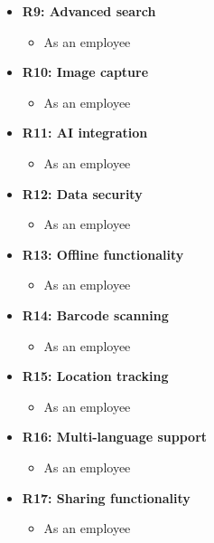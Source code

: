 \documentclass[hidelinks, 12pt, a4paper]{article}
\begin{document}
\begin{itemize}
    \item \textbf{R9: Advanced search}
    \begin{itemize}
        \item As an employee
    \end{itemize}

    \item \textbf{R10: Image capture}
    \begin{itemize}
        \item As an employee
    \end{itemize}

    \item \textbf{R11: AI integration}
    \begin{itemize}
        \item As an employee
    \end{itemize}
    \item \textbf{R12: Data security}
    \begin{itemize}
        \item As an employee
    \end{itemize}

    \item \textbf{R13: Offline functionality}
    \begin{itemize}
        \item As an employee
    \end{itemize}

    \item \textbf{R14: Barcode scanning}
    \begin{itemize}
        \item As an employee
    \end{itemize}

    \item \textbf{R15: Location tracking}
    \begin{itemize}
        \item As an employee
    \end{itemize}

    \item \textbf{R16: Multi-language support}
    \begin{itemize}
        \item As an employee
    \end{itemize}

    \item \textbf{R17: Sharing functionality}
    \begin{itemize}
        \item As an employee
    \end{itemize}


\end{itemize}
\end{document}
